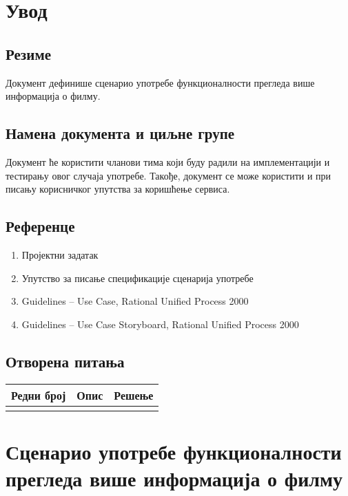 \section{Увод}

\subsection{Резиме}

Документ дефинише сценарио употребе функционалности прегледа више информација о филму.

\subsection{Намена документа и циљне групе}

Документ ће користити чланови тима који буду радили на имплементацији и тестирању овог случаја
употребе. Такође, документ се може користити и при писању корисничког упутства за коришћење
сервиса.

\subsection{Референце}

\begin{enumerate}
    \item Пројектни задатак
    \item Упутство за писање спецификације сценарија употребе
    \item Guidelines – Use Case, Rational Unified Process 2000
    \item Guidelines – Use Case Storyboard, Rational Unified Process 2000
\end{enumerate}

\subsection{Отворена питања}

\noindent
\setcellgapes{4pt}
\makegapedcells
\begin{tabularx}{\linewidth}{|l|X|X|}
    \hline
    \textbf{Редни број} & \textbf{Опис} & \textbf{Решење} \\
    \hline
    & & \\
    \hline
\end{tabularx}

\section{Сценарио употребе функционалности прегледа више информација о филму}

